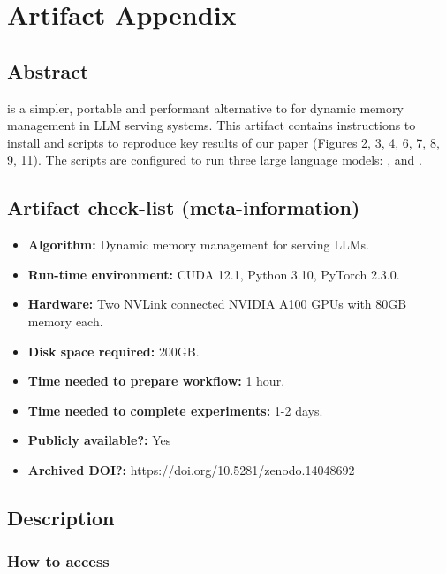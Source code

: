 \appendix
\section{Artifact Appendix}

\subsection{Abstract}

\sysname is a simpler, portable and performant alternative to \pa for dynamic memory management in LLM serving systems. This artifact contains instructions to install \sysname and scripts to reproduce key results of our paper (Figures 2, 3, 4, 6, 7, 8, 9, 11). The scripts are configured to run three large language models: \yismall, \llamasmall and \yimedium. %

\subsection{Artifact check-list (meta-information)}

{\small
\begin{itemize}
  \item {\bf Algorithm: } Dynamic memory management for serving LLMs.
  \item {\bf Run-time environment: } CUDA 12.1, Python 3.10, PyTorch 2.3.0.
  \item {\bf Hardware: } Two NVLink connected NVIDIA A100 GPUs with 80GB memory each.
  \item {\bf Disk space required: } 200GB.
  \item {\bf Time needed to prepare workflow: } 1 hour.
  \item {\bf Time needed to complete experiments: } 1-2 days.
  \item {\bf Publicly available?: } Yes
  \item {\bf Archived  DOI?: } https://doi.org/10.5281/zenodo.14048692
\end{itemize}
}


\subsection{Description}

\subsubsection{How to access}

